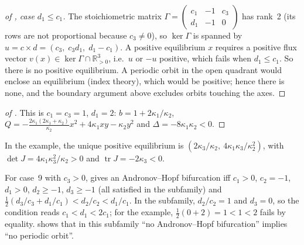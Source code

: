 \documentclass[11pt,a4paper]{report}
\begin{document}
\begin{proof}[of , case \(d_1\le c_1\)]
The stoichiometric matrix \(\Gamma=\begin{pmatrix}c_1&-1&c_3\\ d_1&-1&0\end{pmatrix}\) has rank~2 (its rows are not
proportional because \(c_3\neq0\)), so \(\ker\Gamma\) is spanned by \(u=c\times d=(c_3,\;c_3d_1,\;d_1-c_1)\). A positive
equilibrium \(x\) requires a positive flux vector \(v(x)\in\ker\Gamma\cap\mathbb R^3_{>0}\), i.e.\ \(u\) or \(-u\)
positive, which fails when \(d_1\le c_1\). So there is no positive equilibrium. A periodic orbit in the open quadrant
would enclose an equilibrium (index theory), which would be positive; hence there is none, and the boundary argument
above excludes orbits touching the axes.
\end{proof}

\begin{proof}[of ]
This is \(c_1=c_3=1\), \(d_1=2\): \(b=1+2\kappa_1/\kappa_2\),
\(Q=-\frac{2\kappa_1(2\kappa_1+\kappa_2)}{\kappa_2}x^2+4\kappa_1xy-\kappa_2y^2\) and \(\Delta=-8\kappa_1\kappa_2<0\).
\end{proof}

\begin{remark}
In the example, the unique positive equilibrium is \((2\kappa_3/\kappa_2,\ 4\kappa_1\kappa_3/\kappa_2^2)\), with
\(\det J=4\kappa_1\kappa_3^2/\kappa_2>0\) and \(\operatorname{tr}J=-2\kappa_3<0\).

For case~9 with \(c_3>0\), \autocite[Theorem~9]{BBH2024} gives an Andronov--Hopf bifurcation iff
\(c_1>0\), \(c_2=-1\), \(d_1>0\), \(d_2\ge-1\), \(d_3\ge-1\) (all satisfied in the subfamily) and
\(\tfrac12(d_3/c_3+d_1/c_1)<d_2/c_2<d_1/c_1\). In the subfamily, \(d_2/c_2=1\) and \(d_3=0\), so the condition reads
\(c_1<d_1<2c_1\); for the example, \(\tfrac12(0+2)=1<1<2\) fails by equality.  shows that in this
subfamily ``no Andronov--Hopf bifurcation'' implies ``no periodic orbit''.
\end{remark}
\end{document}
